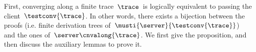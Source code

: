 



\renewcommand{\States}{\ensuremath{A}}


First, converging along a finite trace~$\trace$~is logically
equivalent to passing the client~$\testconv{ \trace}$.  In other
words, there exists a bijection between the proofs (i.e. finite
derivation trees of~$\musti{ \server }{\testconv{ \trace}}$) and
the ones of~$ \server \cnvalong{ \trace }$. We first give the
proposition, and then discuss the auxiliary lemmas to prove it.

